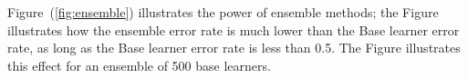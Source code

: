 \documentclass[a4paper,11pt]{article}
\begin{document}





Figure~(\ref{fig:ensemble}) illustrates the power of ensemble methods; the Figure illustrates how the ensemble error rate is much lower than the Base learner error rate, as long as the Base learner error rate is less than 0.5. The Figure illustrates this effect for an ensemble of 500 base learners.







\end{document}
